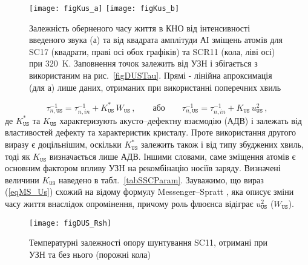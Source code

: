 \begin{figure}
\center
\texttt{[image: figKus\_a]} \hfill
\texttt{[image: figKus\_b]}
\caption{\label{figKus}
Залежність оберненого часу життя в КНО від інтенсивності введеного звука (а)
та від квадрата амплітуди АІ зміщень атомів для SC17 (квадрати, праві осі обох графіків)
та SCR11 (кола, ліві осі) при 320~K.
Заповнення точок залежить від УЗН і збігається з використаним на рис.~\ref{figDUSTau}.
Прямі - лінійна апроксимація (для а) лише даних, отриманих при використанні поперечних хвиль
}%
\end{figure}

\begin{equation}
\label{eqMS_Us}
\tau_{n,\mathtt{US}}^{-1}=\tau_{n,in}^{-1}+K_\mathtt{US}^{*}\,W_\mathtt{US}\,,\qquad\text{або}\qquad\tau_{n,\mathtt{US}}^{-1}=\tau_{n,in}^{-1}+K_\mathtt{US}\,u_\mathtt{US}^2 \,,
\end{equation}
де $K_\mathtt{US}^{*}$ та $K_\mathtt{US}$ характеризують акусто--дефектну взаємодію (АДВ) і залежать від властивостей дефекту та характеристик кристалу.
Проте використання  другого виразу є доцільнішим, оскільки $K_\mathtt{US}^{*}$ залежить також і від типу збуджених хвиль,
тоді як $K_\mathtt{US}$ визначається лише АДВ.
Іншими словами, саме зміщення атомів є основним фактором впливу УЗН на рекомбінацію носіїв заряду.
Визначені величини $K_\mathtt{US}$ наведено в табл.~\ref{tabSSCParam}.
Зауважимо, що вираз (\ref{eqMS_Us}) схожий на відому формулу Messenger--Spratt \cite{Markvart},
яка описує зміни часу життя внаслідок опромінення, причому роль флюєнса відіграє $u_\mathtt{US}^2$ ($W_\mathtt{US}$).



\begin{figure}
\center
\texttt{[image: figDUS\_Rsh]}%
\caption{\label{figDUS_Rsh}
Температурні залежності  опору шунтування SC11, отримані при УЗН та без нього (порожні кола)
}%
\end{figure}

